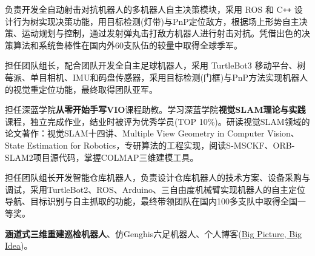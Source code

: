 \documentclass{resume}
\begin{document}
\begin{onehalfspacing}
负责开发全自动射击对抗机器人的多机器人自主决策模块，采用 ROS 和 C\texttt{++} 设计行为树实现决策功能，用目标检测(灯带)与PnP定位敌方，根据场上形势自主决策、运动规划与控制，通过发射弹丸击打敌方机器人进行射击对抗。凭借出色的决策算法和系统鲁棒性在国内外60支队伍的较量中取得全球季军。
\end{onehalfspacing}
\begin{onehalfspacing}
担任团队组长，配合团队开发全自主足球机器人，采用 TurtleBot3 移动平台、树莓派、单目相机、IMU和码盘传感器，采用目标检测(门框)与PnP方法实现机器人的视觉重定位功能，最终取得团队亚军。
\end{onehalfspacing}
\begin{onehalfspacing}
担任深蓝学院\textbf{从零开始手写VIO}课程助教。学习深蓝学院\textbf{视觉SLAM理论与实践}课程，独立完成作业，结业时被评为优秀学员(TOP 10\%)。研读视觉SLAM领域的论文著作：{视觉SLAM十四讲}、{Multiple View Geometry in Computer Vision}、{State Estimation for Robotics}，专研算法的工程实现，阅读S-MSCKF、ORB-SLAM2项目源代码，掌握COLMAP三维建模工具。
\end{onehalfspacing}
\begin{onehalfspacing}
担任团队组长开发智能仓库机器人，负责设计仓库机器人的技术方案、设备采购与调试，采用TurtleBot2、ROS、Arduino、三自由度机械臂实现机器人的自主定位导航、目标识别与自主抓取的功能，最终带领团队在国内100多支队中取得全国一等奖。
\end{onehalfspacing}
\begin{onehalfspacing}
\textbf{涵道式三维重建巡检机器人}、{仿Genghis六足机器人}、个人博客(\href{https://matheecs.github.io}{Big Picture, Big Idea})。
\end{onehalfspacing}
\end{document}
